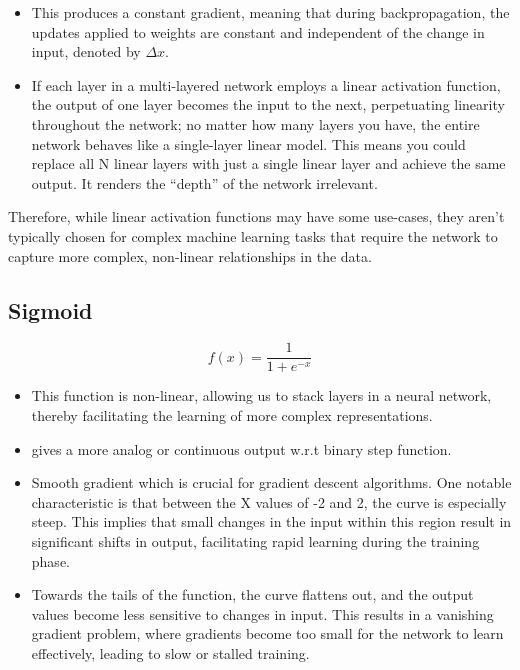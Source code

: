 \documentclass[11pt]{article}
\begin{document}
\begin{itemize}
    \item This produces a constant gradient, meaning that during backpropagation, the updates applied to weights are constant and independent of the change in input, denoted by $\Delta x$.
    \item If each layer in a multi-layered network employs a linear activation function, the output of one layer becomes the input to the next, perpetuating linearity throughout the network; no matter how many layers you have, the entire network behaves like a single-layer linear model. This means you could replace all N linear layers with just a single linear layer and achieve the same output. It renders the ``depth'' of the network irrelevant. 
\end{itemize}

Therefore, while linear activation functions may have some use-cases, they aren't typically chosen for complex machine learning tasks that require the network to capture more complex, non-linear relationships in the data. 

\subsection{Sigmoid}

\begin{definition}\label{eq:activation-sigmoid}
    \begin{equation*}
        f(x) = \frac{1}{1+e^{-x}}
    \end{equation*}
\end{definition}

\begin{itemize}
    \item This function is non-linear, allowing us to stack layers in a neural network, thereby facilitating the learning of more complex representations. 
    \item gives a more analog or continuous output w.r.t binary step function.
    \item Smooth gradient which is crucial for gradient descent algorithms. One notable characteristic is that between the X values of -2 and 2, the curve is especially steep. This implies that small changes in the input within this region result in significant shifts in output, facilitating rapid learning during the training phase.
    \item Towards the tails of the function, the curve flattens out, and the output values become less sensitive to changes in input. This results in a vanishing gradient problem, where gradients become too small for the network to learn effectively, leading to slow or stalled training. 
\end{itemize}
\end{document}
